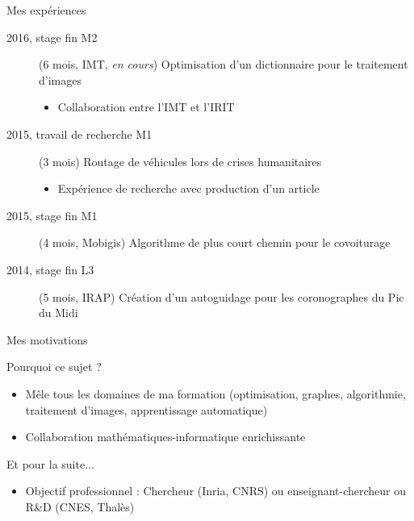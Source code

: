 \begin{frame}{Mes expériences}
\begin{description}
\item[2016, stage fin M2] (6 mois, \textsc{IMT}, \emph{en cours}) Optimisation d'un dictionnaire pour le traitement d'images
\begin{itemize}
\item Collaboration entre l'\textsc{IMT} et l'\textsc{IRIT}
\end{itemize}
\item[2015, travail de recherche M1] (3 mois) Routage de véhicules lors de crises humanitaires
\begin{itemize}
\item \alert{Expérience de recherche} avec production d'un \alert{article}
\end{itemize}
\item[2015, stage fin M1] (4 mois, Mobigis) Algorithme de plus court chemin pour le covoiturage
\item[2014, stage fin L3] (5 mois, IRAP) Création d'un autoguidage pour les coronographes du Pic du Midi 
\end{description}
\end{frame}





\begin{frame}{Mes motivations}

Pourquoi ce sujet ?
\begin{itemize}
\item Mêle \alert{tous les domaines} de ma formation (optimisation, graphes, algorithmie, traitement d'images, apprentissage automatique)
\item Collaboration \alert{mathématiques-informatique} enrichissante
\end{itemize}
Et pour la suite...
\begin{itemize}
\item Objectif professionnel : \alert{Chercheur} (Inria, CNRS) ou enseignant-chercheur ou R\&D (CNES, Thalès)
\end{itemize}
\end{frame}






